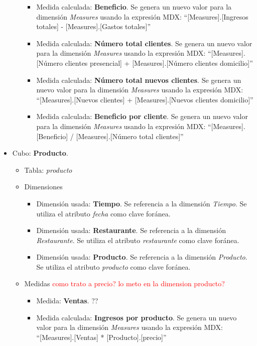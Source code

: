 \documentclass[11pt]{opticajnl}
\begin{document}
\begin{itemize}
\begin{itemize}
\begin{itemize}
\item Medida calculada: \textbf{Beneficio}. Se genera un nuevo valor para la dimensión \textit{Measures} usando la expresión MDX: ``[Measures].[Ingresos totales] - [Measures].[Gastos totales]''
\item Medida calculada: \textbf{Número total clientes}. Se genera un nuevo valor para la dimensión \textit{Measures} usando la expresión MDX: ``[Measures].[Número clientes presencial] + [Measures].[Número clientes domicilio]''
\item Medida calculada: \textbf{Número total nuevos clientes}. Se genera un nuevo valor para la dimensión \textit{Measures} usando la expresión MDX: ``[Measures].[Nuevos clientes] + [Measures].[Nuevos clientes domicilio]''
\item Medida calculada: \textbf{Beneficio por cliente}. Se genera un nuevo valor para la dimensión \textit{Measures} usando la expresión MDX: ``[Measures].[Beneficio] / [Measures].[Número total clientes]''
\end{itemize}
\end{itemize}
\item Cubo: \textbf{Producto}.
\begin{itemize}
\item Tabla: \textit{producto}
\item Dimensiones
\begin{itemize}
\item Dimensión usada: \textbf{Tiempo}. Se referencia a la dimensión \textit{Tiempo}. Se utiliza el atributo \textit{fecha} como clave foránea.
\item Dimensión usada: \textbf{Restaurante}. Se referencia a la dimensión \textit{Restaurante}. Se utiliza el atributo \textit{restaurante} como clave foránea.
\item Dimensión usada: \textbf{Producto}. Se referencia a la dimensión \textit{Producto}. Se utiliza el atributo \textit{producto} como clave foránea.
\end{itemize}
\item Medidas \textcolor{red}{como trato a precio? lo meto en la dimension producto?}
\begin{itemize}
\item Medida: \textbf{Ventas}. ??
\item Medida calculada: \textbf{Ingresos por producto}. Se genera un nuevo valor para la dimensión \textit{Measures} usando la expresión MDX: ``[Measures].[Ventas] * [Producto].[precio]''
\end{itemize}
\end{itemize}

\end{itemize}
\end{document}
